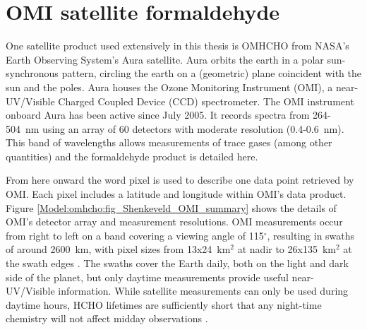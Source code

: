 

\section{OMI satellite formaldehyde}
\label{Model:omhcho}
  
  One satellite product used extensively in this thesis is OMHCHO from NASA's Earth Observing System's Aura satellite. %
  Aura orbits the earth in a polar sun-synchronous pattern, circling the earth on a (geometric) plane coincident with the sun and the poles.
  Aura houses the Ozone Monitoring Instrument (OMI), a near-UV/Visible Charged Coupled Device (CCD) spectrometer.
  The OMI instrument onboard Aura has been active since July 2005.
  It records spectra from 264-504~nm using an array of 60 detectors with moderate resolution (0.4-0.6~nm).
  This band of wavelengths allows measurements of trace gases (among other quantities) and the formaldehyde product is detailed here.
  
  
  From here onward the word pixel is used to describe one data point retrieved by OMI.
  Each pixel includes a latitude and longitude within OMI's data product.
  Figure \ref{Model:omhcho:fig_Shenkeveld_OMI_summary} shows the details of OMI's detector array and measurement resolutions.
  OMI measurements occur from right to left on a band covering a viewing angle of 115$^{\circ}$, resulting in swaths of around 2600~km, with pixel sizes from 13x24~km$^2$ at nadir to 26x135~km$^2$ at the swath edges \parencite{Abad2015}.
  The swaths cover the Earth daily, both on the light and dark side of the planet, but only daytime measurements provide useful near-UV/Visible information.
  While satellite measurements can only be used during daytime hours, HCHO lifetimes are sufficiently short that any night-time chemistry will not affect midday observations \parencite{Wolfe2016}.
  
